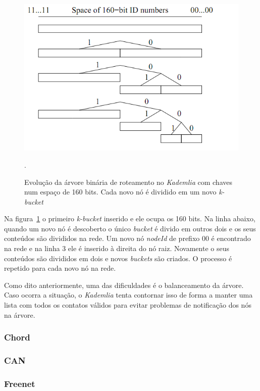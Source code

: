 \begin{figure}
	\centering
	\includegraphics[scale=0.5]{images/kademlia-k-bucket.png}
	\caption{Evolução da árvore binária de roteamento no \emph{Kademlia} com chaves num espaço de 160 bits. Cada novo nó é dividido em um novo \emph{k-bucket}}.
	\label{fig:kademlia-k-bucket}
\end{figure}

Na figura~\ref{fig:kademlia-k-bucket} o primeiro \emph{k-bucket} inserido e ele ocupa os 160 bits. Na linha abaixo, quando um novo nó é descoberto o único \emph{bucket} é divido em outros dois e os seus conteúdos são divididos na rede. Um novo nó \emph{nodeId} de prefixo 00 é encontrado na rede e na linha 3 ele é inserido à direita do nó raiz. Novamente o seus conteúdos são divididos em dois e novos \emph{buckets} são criados. O processo é repetido para cada novo nó na rede.

Como dito anteriormente, uma das dificuldades é o balanceamento da árvore. Caso ocorra a situação, o \emph{Kademlia} tenta contornar isso de forma a manter uma lista com todos os contatos válidos para evitar problemas de notificação dos nós na árvore.

\subsubsection{Chord}

\subsubsection{CAN}

\subsubsection{Freenet}


